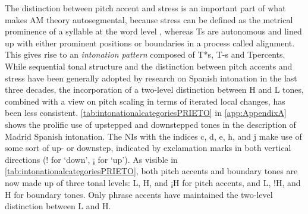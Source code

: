 The distinction between pitch accent and stress is an important part of what makes \ac{AM} theory autosegmental, because stress can be defined as the metrical prominence of a syllable at the word level \citep{Hyman2014,Buchholz.inprep}, whereas \acp{T} are au\-to\-no\-mous and lined up with either prominent positions or boundaries in a process called alignment. This gives rise to an \textit{intonation pattern} composed of \acp{T*}, \acp{T-} and \acp{Tpercent}. While sequential tonal structure and the distinction between pitch accents and stress have been generally adopted by research on Spanish intonation in the last three decades, the incorporation of a two-level distinction between H and L tones, combined with a view on pitch scaling in terms of iterated local changes, has been less consistent. \autoref{tab:intonationalcategoriesPRIETO} in \autoref{app:AppendixA} shows the prolific use of upstepped and downstepped tones in the description of Madrid Spanish intonation. The \acp{NI} with the indices c, d, e, h, and j make use of some sort of up- or downstep, indicated by exclamation marks in both vertical directions (! for `down', ¡ for `up'). As visible in \autoref{tab:intonationalcategoriesPRIETO}, both pitch accents and boundary tones are now made up of three tonal levels: L, H, and ¡H for pitch accents, and L, !H, and H for boundary tones. Only phrase accents have maintained the two-level distinction between L and H.

